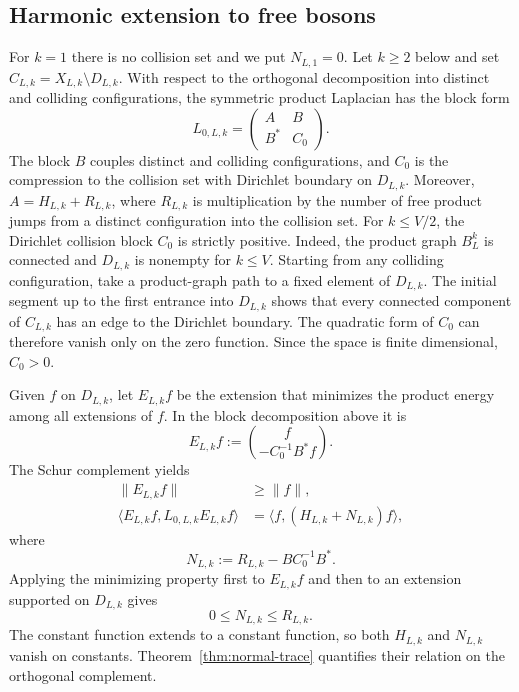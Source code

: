 \documentclass[11pt]{article}
\numberwithin{equation}{section}
\theoremstyle{remark}
\newcommand{\1}{\mathbf 1}
\begin{document}
\subsection{Harmonic extension to free bosons}
\label{subsec:harmonic-extension}

For \(k=1\) there is no collision set and we put \(N_{L,1}=0\).  Let
\(k\geq2\) below and set \(C_{L,k}=X_{L,k}\setminus D_{L,k}\).  With
respect to the orthogonal decomposition into distinct and colliding
configurations, the symmetric product Laplacian has the block form
\begin{equation}
 L_{0,L,k}=
 \begin{pmatrix}
  A&B\\ B^*&C_0
 \end{pmatrix}.
 \label{eq:block-product-laplacian}
\end{equation}
The block \(B\) couples distinct and colliding configurations, and
\(C_0\) is the compression to the collision set with Dirichlet boundary
on \(D_{L,k}\).  Moreover, \(A=H_{L,k}+R_{L,k}\), where \(R_{L,k}\) is
multiplication by the
number of free product jumps from a distinct configuration into the
collision set.  For \(k\leq V/2\), the Dirichlet collision block \(C_0\) is
strictly positive.  Indeed, the product graph \(B_L^k\) is connected and
\(D_{L,k}\) is nonempty for \(k\leq V\).  Starting from any colliding
configuration, take a product-graph path to a fixed element of
\(D_{L,k}\).  The initial segment up to the first entrance into
\(D_{L,k}\) shows that every connected component of \(C_{L,k}\) has an
edge to the Dirichlet boundary.  The quadratic form of \(C_0\) can
therefore vanish only on the zero function.  Since the space is finite
dimensional, \(C_0>0\).

Given \(f\) on \(D_{L,k}\), let \(E_{L,k}f\) be the extension that
minimizes the product energy among all extensions of \(f\).  In the block
decomposition above it is
\begin{equation}
 E_{L,k}f:=\binom{f}{-C_0^{-1}B^*f}.
 \label{eq:harmonic-extension}
\end{equation}
The Schur complement yields
\begin{align}
 \|E_{L,k}f\|&\geq\|f\|,
 \label{eq:extension-norm}\\
 \langle E_{L,k}f,L_{0,L,k}E_{L,k}f\rangle
 &=\langle f,(H_{L,k}+N_{L,k})f\rangle,
 \label{eq:extension-energy}
\end{align}
where
\begin{equation}
 N_{L,k}:=R_{L,k}-BC_0^{-1}B^*.
 \label{eq:normal-correction}
\end{equation}
Applying the minimizing property first to \(E_{L,k}f\) and then to an
extension supported on \(D_{L,k}\) gives
\begin{equation}
 0\leq N_{L,k}\leq R_{L,k}.
 \label{eq:N-between-zero-R}
\end{equation}
The constant function extends to a constant function, so both \(H_{L,k}\)
and \(N_{L,k}\) vanish on constants.  Theorem~\ref{thm:normal-trace}
quantifies their relation on the orthogonal complement.
\end{document}
